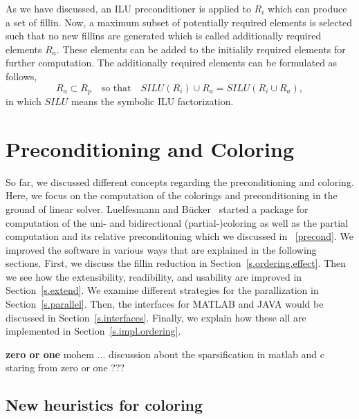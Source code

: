 \documentclass[12pt, oneside]{book}
\newcommand{\todo}[1]{\textbf{#1}}
\begin{document}
As we have discussed, an ILU preconditioner is applied to $R_i$ which can
produce a set of fillin. Now, a maximum subset of potentially required elements
is selected such that no new fillins are generated which is called
additionally required elements $R_a$. These elements can be added to the
initialily required elements for further computation. 
The additionally required elements can be formulated as follows,
$$
R_a \subset R_p \quad\text{so that}\quad SILU(R_i) \cup R_a = SILU(R_i\cup R_a),
$$ 
in which $SILU$ means the symbolic ILU factorization.

\chapter{Preconditioning and Coloring}
\label{package}
So far, we discussed different concepts regarding the preconditioning and coloring.
Here, we focus on the computation of the colorings and preconditioning in the ground of linear solver. 
Luelfesmann and B{\"u}cker~\cite{Lulfesmann2012Fap} started a package for computation of the uni- 
and bidirectional (partial-)coloring as well as the partial computation and its relative preconditoning which we discussed in ~\ref{precond}. 
We improved the software in various ways that are explained in the following sections.
First, we discuss the fillin reduction in Section~\ref{s.ordering.effect}.
Then we see how the extensibility, readibility, and usability are improved 
in Section~\ref{s.extend}. 
We examine different strategies for the parallization 
in Section~\ref{s.parallel}.
Then, the interfaces for MATLAB and JAVA would be discussed
in Section~\ref{s.interfaces}.
Finally, we explain how these all are implemented in
Section~\ref{s.impl.ordering}.

\todo{zero or one}
mohem ... discussion about the sparsification in matlab and c
staring from zero or one ???

\section{New heuristics for coloring}
\label{s.heuristic}
\end{document}
